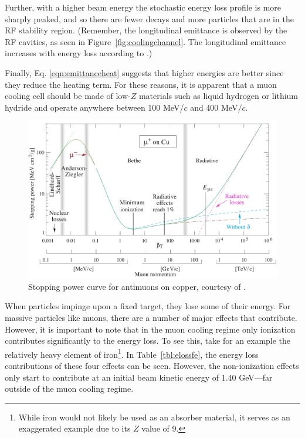 Further, with a higher beam energy the stochastic energy loss profile is more sharply peaked, and so there are fewer decays and more particles that are in the RF stability region. (Remember, the longitudinal emittance is observed by the RF cavities, as seen in Figure~\ref{fig:coolingchannel}. The longitudinal emittance increases with energy loss according to \cite{Fernow}.) 



\fi
Finally, Eq. \eqref{eqn:emittanceheat} suggests that higher energies are better since they reduce the heating term. For these reasons, it is apparent that a muon cooling cell should be made of low-$Z$ materials such as liquid hydrogen or lithium hydride and operate anywhere between 100 MeV/$c$ and 400 MeV$/c$.

\begin{figure}
  \centering
    \includegraphics[width=\textwidth]{Figures/bethecurve} 
  \caption[Stopping power curve for antimuons on copper.]{Stopping power curve for antimuons on copper, courtesy of \cite{PDG}. }
  \label{fig:bethecurve}
\end{figure}

When particles impinge upon a fixed target, they lose some of their energy. For massive particles like muons, there are a number of major effects that contribute. However, it is important to note that in the muon cooling regime only ionization contributes significantly to the energy loss. To see this, take for an example the relatively heavy element of iron\footnote{While iron would not likely be used as an absorber material, it serves as an exaggerated example due to its $Z$ value of 9.}. In Table~\ref{tbl:elossfe}, the energy loss contributions of these four effects can be seen. However, the non-ionization effects only start to contribute at an initial beam kinetic energy of 1.40 GeV---far outside of the muon cooling regime.

